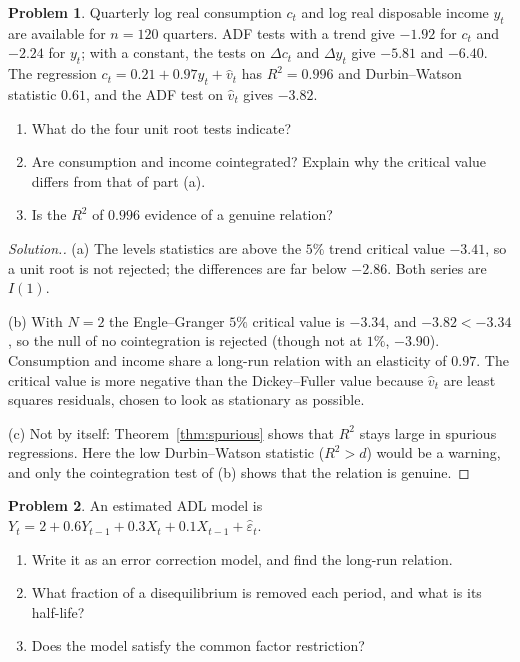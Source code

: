 \documentclass[11pt,a4paper]{article}
\numberwithin{equation}{section}
\theoremstyle{definition}
\newtheorem{problemx}{Problem}[subsection]
\newenvironment{problem}{\begin{problemx}}{\end{problemx}}
\newenvironment{solution}
  {\renewcommand{\qedsymbol}{}\begin{proof}[\textit{Solution}.]}
  {\end{proof}}
\begin{document}
\begin{problem}
Quarterly log real consumption $c_t$ and log real disposable income $y_t$ are available for $n = 120$ quarters. ADF tests with a trend give $-1.92$ for $c_t$ and $-2.24$
for $y_t$; with a constant, the tests on $\Delta c_t$ and $\Delta y_t$ give $-5.81$ and $-6.40$. The regression $c_t = 0.21 + 0.97y_t + \hat v_t$ has $R^2 = 0.996$ and Durbin--Watson
statistic $0.61$, and the ADF test on $\hat v_t$ gives $-3.82$.
\begin{enumerate}[label=(\alph*)]
\item What do the four unit root tests indicate?
\item Are consumption and income cointegrated? Explain why the critical value differs from that of part (a).
\item Is the $R^2$ of $0.996$ evidence of a genuine relation?
\end{enumerate}
\end{problem}

\begin{solution}
(a) The levels statistics are above the $5\%$ trend critical value $-3.41$, so a unit root is not rejected; the differences are far below $-2.86$. Both series are
$I(1)$.

(b) With $N = 2$ the Engle--Granger $5\%$ critical value is $-3.34$, and $-3.82 < -3.34$, so the null of no cointegration is rejected (though not at $1\%$, $-3.90$).
Consumption and income share a long-run relation with an elasticity of $0.97$. The critical value is more negative than the Dickey--Fuller value because
$\hat v_t$ are least squares residuals, chosen to look as stationary as possible.

(c) Not by itself: Theorem~\ref{thm:spurious} shows that $R^2$ stays large in spurious regressions. Here the low Durbin--Watson statistic ($R^2 > d$) would
be a warning, and only the cointegration test of (b) shows that the relation is genuine.
\end{solution}

\begin{problem}
An estimated ADL model is $Y_t = 2 + 0.6Y_{t-1} + 0.3X_t + 0.1X_{t-1} + \hat\varepsilon_t$.
\begin{enumerate}[label=(\alph*)]
\item Write it as an error correction model, and find the long-run relation.
\item What fraction of a disequilibrium is removed each period, and what is its half-life?
\item Does the model satisfy the common factor restriction?
\end{enumerate}
\end{problem}
\end{document}
